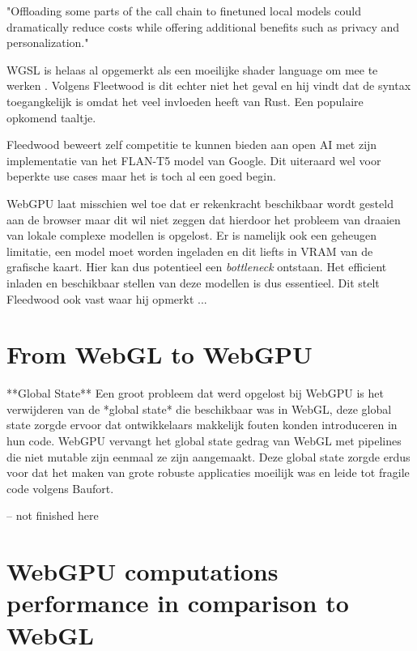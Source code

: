 \begin{displayquote}
    "Offloading some parts of the call chain to finetuned local models could dramatically reduce costs while offering additional benefits such as privacy and personalization." \autocite{Fleetwood2023a}
\end{displayquote}

\bigbreak{}

WGSL is helaas al opgemerkt als een moeilijke shader language om mee te werken \textcite{Madrigal2023}. Volgens Fleetwood is dit echter niet het geval en hij vindt dat de syntax toegangkelijk is omdat het veel invloeden heeft van Rust. Een populaire opkomend taaltje.

\bigbreak{}

Fleedwood beweert zelf competitie te kunnen bieden aan open AI met zijn implementatie van het FLAN-T5 model van Google. Dit uiteraard wel voor beperkte use cases maar het is toch al een goed begin.

\bigbreak{}

WebGPU laat misschien wel toe dat er rekenkracht beschikbaar wordt gesteld aan de browser maar dit wil niet zeggen dat hierdoor het probleem van draaien van lokale complexe modellen is opgelost. Er is namelijk ook een geheugen limitatie, een model moet worden ingeladen en dit liefts in VRAM van de grafische kaart. Hier kan dus potentieel een \textit{bottleneck} ontstaan. Het efficient inladen en beschikbaar stellen van deze modellen is dus essentieel. Dit stelt Fleedwood ook vast waar hij opmerkt ... 

\section{From WebGL to WebGPU}

**Global State**
Een groot probleem dat werd opgelost bij WebGPU is het verwijderen van de *global state* die beschikbaar was in WebGL, deze global state zorgde ervoor dat ontwikkelaars makkelijk fouten konden introduceren in hun code. WebGPU vervangt het global state gedrag van WebGL met pipelines die niet mutable zijn eenmaal ze zijn aangemaakt.
Deze global state zorgde erdus voor dat het maken van grote robuste applicaties moeilijk was en leide tot fragile code volgens Baufort.

-- not finished here


\section{WebGPU computations performance in comparison to WebGL} %

